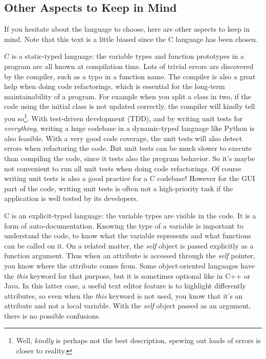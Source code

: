 \subsection{Other Aspects to Keep in Mind}
If you hesitate about the language to choose, here are other aspects to keep in mind. Note that this text is a little biased since the C language has been chosen.

C is a static-typed language: the variable types and function prototypes in a program are all known at compilation time. Lots of trivial errors are discovered by the compiler, such as a typo in a function name. The compiler is also a great help when doing code refactorings, which is essential for the long-term maintainability of a program. For example when you split a class in two, if the code using the initial class is not updated correctly, the compiler will kindly tell you so\footnote{Well, \emph{kindly} is perhaps not the best description, spewing out loads of errors is closer to reality.}. With test-driven development (TDD), and by writing unit tests for \emph{everything}, writing a huge codebase in a dynamic-typed language like Python is also feasible. With a very good code coverage, the unit tests will also detect errors when refactoring the code. But unit tests can be much slower to execute than compiling the code, since it tests also the program behavior. So it's maybe not convenient to run all unit tests when doing code refactorings. Of course writing unit tests is also a good practice for a C codebase! However for the GUI part of the code, writing unit tests is often not a high-priority task if the application is well tested by its developers.

C is an explicit-typed language: the variable types are visible in the code. It is a form of auto-documentation. Knowing the type of a variable is important to understand the code, to know what the variable represents and what functions can be called on it. On a related matter, the \emph{self} object is passed explicitly as a function argument. Thus when an attribute is accessed through the \emph{self} pointer, you know where the attribute comes from. Some object-oriented languages have the \emph{this} keyword for that purpose, but it is sometimes optional like in C++ or Java. In this latter case, a useful text editor feature is to highlight differently attributes, so even when the \emph{this} keyword is not used, you know that it's an attribute and not a local variable. With the \emph{self} object passed as an argument, there is no possible confusions.


